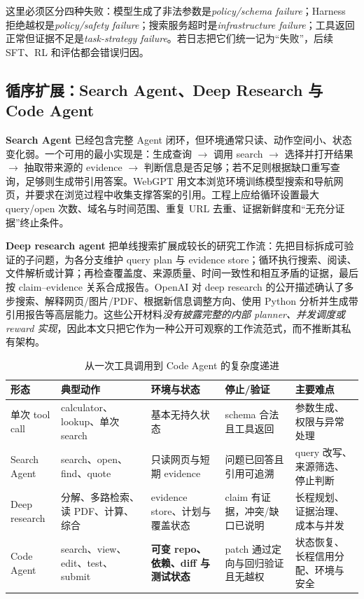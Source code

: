 \documentclass[10pt,a4paper,UTF8,fontset=none]{ctexart}
\begin{document}
这里必须区分四种失败：模型生成了非法参数是\emph{policy/schema failure}；Harness 拒绝越权是\emph{policy/safety failure}；搜索服务超时是\emph{infrastructure failure}；工具返回正常但证据不足是\emph{task-strategy failure}。若日志把它们统一记为“失败”，后续 SFT、RL 和评估都会错误归因。

\subsection{循序扩展：Search Agent、Deep Research 与 Code Agent}

\textbf{Search Agent} 已经包含完整 Agent 闭环，但环境通常只读、动作空间小、状态变化弱。一个可用的最小实现是：生成查询 $\rightarrow$ 调用 search $\rightarrow$ 选择并打开结果 $\rightarrow$ 抽取带来源的 evidence $\rightarrow$ 判断信息是否足够；若不足则根据缺口重写查询，足够则生成带引用答案。WebGPT 用文本浏览环境训练模型搜索和导航网页，并要求在浏览过程中收集支撑答案的引用\cite{nakano2021webgpt}。工程上应给循环设置最大 query/open 次数、域名与时间范围、重复 URL 去重、证据新鲜度和“无充分证据”终止条件。

\textbf{Deep research agent} 把单线搜索扩展成较长的研究工作流：先把目标拆成可验证的子问题，为各分支维护 query plan 与 evidence store；循环执行搜索、阅读、文件解析或计算；再检查覆盖度、来源质量、时间一致性和相互矛盾的证据，最后按 claim--evidence 关系合成报告。OpenAI 对 deep research 的公开描述确认了多步搜索、解释网页/图片/PDF、根据新信息调整方向、使用 Python 分析并生成带引用报告等高层能力\cite{openai2025deepresearch}。这些公开材料\emph{没有披露完整的内部 planner、并发调度或 reward 实现}，因此本文只把它作为一种公开可观察的工作流范式，而不推断其私有架构。

\begin{table}[htbp]
\centering
\caption{从一次工具调用到 Code Agent 的复杂度递进}
\label{tab:agent-progression}
\small
\begin{tabularx}{\textwidth}{p{2.45cm}YYYY}
\toprule
形态 & 典型动作 & 环境与状态 & 停止/验证 & 主要难点 \\
\midrule
单次 tool call & calculator、lookup、单次 search & 基本无持久状态 & schema 合法且工具返回 & 参数生成、权限与异常处理 \\
Search Agent & search、open、find、quote & 只读网页与短期 evidence & 问题已回答且引用可追溯 & query 改写、来源筛选、停止判断 \\
Deep research & 分解、多路检索、读 PDF、计算、综合 & evidence store、计划与覆盖状态 & claim 有证据，冲突/缺口已说明 & 长程规划、证据治理、成本与并发 \\
Code Agent & search、view、edit、test、submit & \textbf{可变 repo、依赖、diff 与测试状态} & patch 通过定向与回归验证且无越权 & 状态恢复、长程信用分配、环境与安全 \\
\bottomrule
\end{tabularx}
\end{table}
\end{document}
